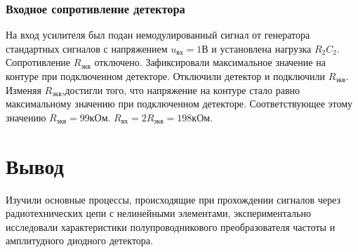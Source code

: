 \subsubsection{Входное сопротивление детектора}
На вход усилителя был подан немодулированный сигнал от генератора стандартных
сигналов с напряжением $u_{\text{вх}} = 1\text{В}$ и установлена нагрузка $R_2 C_2$. Сопротивление $R_{\text{экв}}$  отключено. Зафиксировали максимальное значение на контуре при подключенном детекторе. Отключили детектор и подключили $R_{\text{экв}}$. Изменяя $R_{\text{экв}}$,достигли того, что напряжение на контуре стало равно максимальному значению при подключенном детекторе. Соответствующее этому значению $R_{\text{экв}} =99 \text{кОм}$. $R_{\text{вх}} = 2R_{\text{экв}} = 198\text{кОм}$. 
\section{Вывод}
Изучили основные процессы, происходящие при прохождении сигналов через радиотехнических цепи с нелинейными элементами, экспериментально исследовали характеристики полупроводникового преобразователя частоты и амплитудного диодного детектора. 

